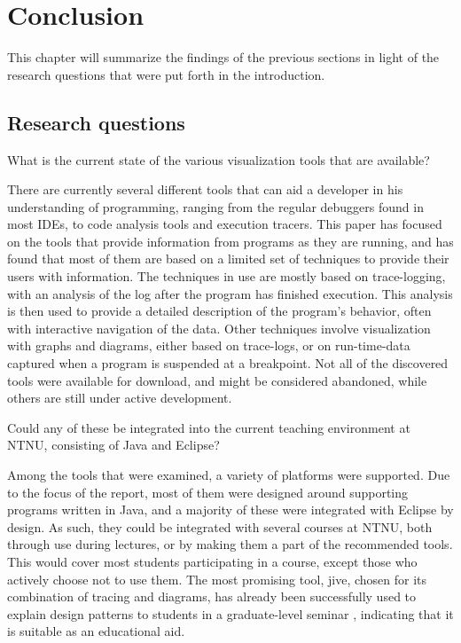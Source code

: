 \chapter{Conclusion}\label{conclusion}

This chapter will summarize the findings of the previous sections in light of the research questions that were put forth in the introduction.

\section{Research questions}\label{conclusionRQs}

\begin{theorem}
What is the current state of the various visualization tools that are available?
\end{theorem}
There are currently several different tools that can aid a developer in his understanding of programming, ranging from the regular debuggers found in most IDEs, to code analysis tools and execution tracers.
This paper has focused on the tools that provide information from programs as they are running, and has found that most of them are based on a limited set of techniques to provide their users with information.
The techniques in use are mostly based on trace-logging, with an analysis of the log after the program has finished execution.
This analysis is then used to provide a detailed description of the program's behavior, often with interactive navigation of the data.
Other techniques involve visualization with graphs and diagrams, either based on trace-logs, or on run-time-data captured when a program is suspended at a breakpoint.
Not all of the discovered tools were available for download, and might be considered abandoned, while others are still under active development.

\begin{theorem}
Could any of these be integrated into the current teaching environment at NTNU, consisting of Java and Eclipse?
\end{theorem}
Among the tools that were examined, a variety of platforms were supported.
Due to the focus of the report, most of them were designed around supporting programs written in Java, and a majority of these were integrated with Eclipse by design.
As such, they could be integrated with several courses at NTNU, both through use during lectures, or by making them a part of the recommended tools.
This would cover most students participating in a course, except those who actively choose not to use them.
The most promising tool, \gls{jive}, chosen for its combination of tracing and diagrams, has already been successfully used to explain design patterns to students in a graduate-level seminar \cite[p. 99]{Gestwicki2005}, indicating that it is suitable as an educational aid.

